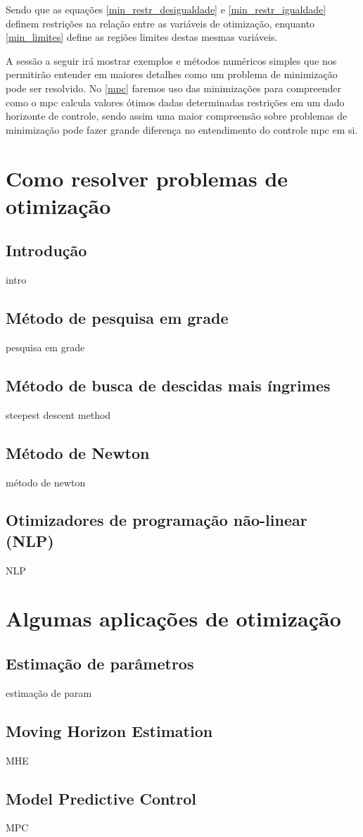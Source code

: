 Sendo que as equações \ref{min_restr_desigualdade} e \ref{min_restr_igualdade} definem restrições na relação entre as variáveis de otimização, enquanto \ref{min_limites} define as regiões limites destas mesmas variáveis.

A sessão a seguir irá mostrar exemplos e métodos numéricos simples que nos permitirão entender em maiores detalhes como um problema de minimização pode ser resolvido. No \autoref{mpc} faremos uso das minimizações para compreender como o \acrshort{mpc} calcula valores ótimos dadas determinadas restrições em um dado horizonte de controle, sendo assim uma maior compreensão sobre problemas de minimização pode fazer grande diferença no entendimento do controle \acrshort{mpc} em si.

\section{Como resolver problemas de otimização}

\subsection{Introdução}

intro

\subsection{Método de pesquisa em grade}

pesquisa em grade

\subsection{Método de busca de descidas mais íngrimes}

steepest descent method

\subsection{Método de Newton}

método de newton

\subsection{Otimizadores de programação não-linear (NLP)}

NLP

\section{Algumas aplicações de otimização}

\subsection{Estimação de parâmetros}

estimação de param

\subsection{Moving Horizon Estimation}

MHE

\subsection{Model Predictive Control}

MPC